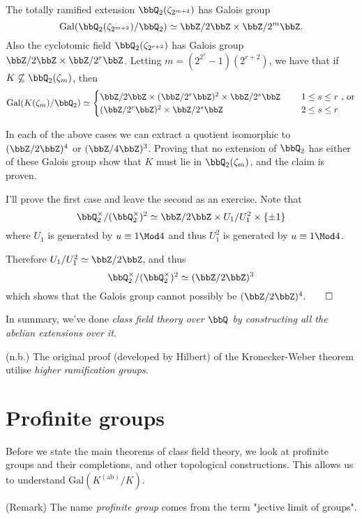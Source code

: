 \documentclass[a4paper, 12pt,oneside,openany]{book}
\begin{document}

 The totally ramified extension $\bbQ_2(\zeta_{2^{m+2}})$ has Galois group $$\text{Gal}(\bbQ_2(\zeta_{2^{m+2}})/\bbQ_2) \simeq \bbZ/2\bbZ \times \bbZ/2^m \bbZ.$$ Also the cyclotomic field $\bbQ_2(\zeta_{2^{r+2}})$ has Galois group $\bbZ/2\bbZ \times \bbZ/2^r \bbZ$. Letting $m = (2^{2^{r}}-1)(2^{r+2})$, we have that if $K \not\subseteq \bbQ_2(\zeta_m)$, then $$\text{Gal}(K(\zeta_m)/\bbQ_2) \simeq \begin{cases} \bbZ/2\bbZ \times (\bbZ/2^r \bbZ)^2 \times \bbZ/2^s \bbZ \quad\ & 1 \leq s \leq r\ \text{, or} \\ (\bbZ/2^r \bbZ)^2 \times \bbZ/ 2^s \bbZ \quad \ & 2 \leq s \leq r \end{cases}$$

In each of the above cases we can extract a quotient isomorphic to $(\bbZ/2\bbZ)^4$ or $(\bbZ/4\bbZ)^3$. Proving that no extension of $\bbQ_2$ has either of these Galois group show that $K$ must lie in $\bbQ_2(\zeta_m)$, and the claim is proven. 

I'll prove the first case and leave the second as an exercise. Note that $$\bbQ_2^\times / (\bbQ_2^\times)^2 \simeq \bbZ/2\bbZ \times U_1/U_1^2 \times \{\pm 1\}$$ where $U_1$ is generated by $u \equiv 1\Mod4$ and thus $U_1^2$ is generated by $u \equiv 1\Mod4$.

Therefore $U_1/U_1^2 \simeq \bbZ/2\bbZ$, and thus $$\bbQ_2^\times / (\bbQ_2^\times)^2 \simeq (\bbZ/2\bbZ)^3$$ which shows that the Galois group cannot possibly be $(\bbZ/2\bbZ)^4. \qed$ 

In summary, we've done \emph{class field theory over $\bbQ$ by constructing all the abelian extensions over it.} 

(n.b.) The original proof (developed by Hilbert) of the Kronecker-Weber theorem utilise \emph{higher ramification groups}. 

\section{Profinite groups}

Before we state the main theorems of class field theory, we look at profinite groups and their completions, and other topological constructions. This allows us to understand $\text{Gal}(K^({\text{ab}})/K)$. 

(Remark) The name \emph{profinite group} comes from the term "jective limit of  groups". 
\end{document}
